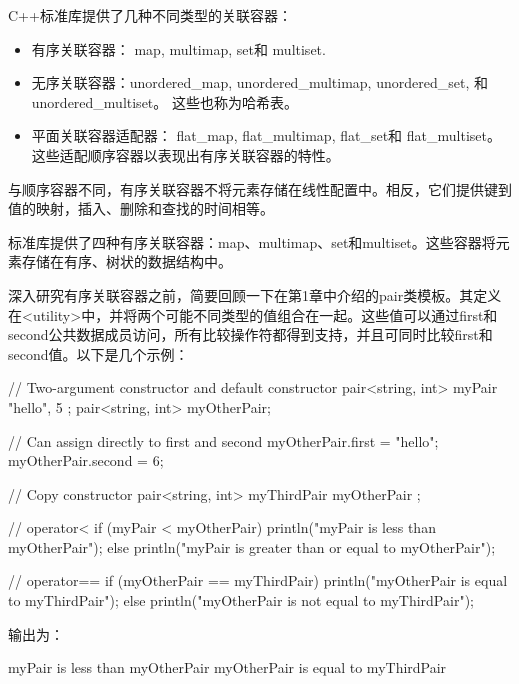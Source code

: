 

C++标准库提供了几种不同类型的关联容器：

\begin{itemize}
\item
有序关联容器： map, multimap, set和 multiset.

\item
无序关联容器：unordered\_map, unordered\_multimap, unordered\_set, 和unordered\_multiset。 这些也称为哈希表。

\item
平面关联容器适配器： flat\_map, flat\_multimap, flat\_set和 flat\_multiset。这些适配顺序容器以表现出有序关联容器的特性。

\end{itemize}


与顺序容器不同，有序关联容器不将元素存储在线性配置中。相反，它们提供键到值的映射，插入、删除和查找的时间相等。

标准库提供了四种有序关联容器：map、multimap、set和multiset。这些容器将元素存储在有序、树状的数据结构中。


深入研究有序关联容器之前，简要回顾一下在第1章中介绍的pair类模板。其定义在<utility>中，并将两个可能不同类型的值组合在一起。这些值可以通过first和second公共数据成员访问，所有比较操作符都得到支持，并且可同时比较first和second值。以下是几个示例：

\begin{cpp}
// Two-argument constructor and default constructor
pair<string, int> myPair { "hello", 5 };
pair<string, int> myOtherPair;

// Can assign directly to first and second
myOtherPair.first = "hello";
myOtherPair.second = 6;

// Copy constructor
pair<string, int> myThirdPair { myOtherPair };

// operator<
if (myPair < myOtherPair) {
    println("myPair is less than myOtherPair");
} else {
    println("myPair is greater than or equal to myOtherPair");
}

// operator==
if (myOtherPair == myThirdPair) {
    println("myOtherPair is equal to myThirdPair");
} else {
    println("myOtherPair is not equal to myThirdPair");
}
\end{cpp}

输出为：

\begin{shell}
myPair is less than myOtherPair
myOtherPair is equal to myThirdPair
\end{shell}

